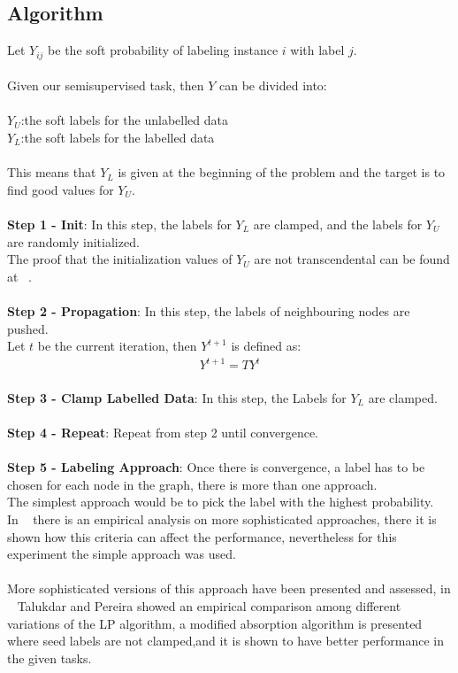 \documentclass[4pt,a4paper,twocolumn]{article}
\begin{document}
\subsection{Algorithm}
Let $Y_{ij}$ be the soft probability of labeling instance $i$ with label $j$.\\
\\
Given our semisupervised task, then $Y$ can be divided into:\\
\\
$Y_{U}$:the soft labels for the unlabelled data\\
$Y_{L}$:the soft labels for the labelled data\\
\\
This means that $Y_{L}$ is given at the beginning of the problem
and the target is to find good values for $Y_{U}$.\\
\\
\textbf{Step 1 - Init}: In this step, the labels for $Y_{L}$ are clamped, and the labels for $Y_{U}$ are randomly initialized.\\
The proof that the initialization values of $Y_{U}$ are not transcendental can be found at ~\cite{Zhu:2005:SLG:1104523}.\\
\\
\textbf{Step 2 - Propagation}: In this step, the labels of neighbouring nodes are pushed.\\
Let $t$ be the current iteration, then $Y^{t+1}$ is defined as:
\begin{align}
Y^{t+1} = T Y^{t}
\end{align}
\\
\textbf{Step 3 - Clamp Labelled Data}: In this step, the Labels for $Y_{L}$ are clamped.\\
\\
\textbf{Step 4 - Repeat}: Repeat from step 2 until convergence.\\
\\
\textbf{Step 5 - Labeling Approach}: Once there is convergence, a label has to be chosen for each node in the graph, there is more than one approach.\\
The simplest approach would be to pick the label with the highest probability. \\
In ~\cite{Zhu:2005:SLG:1104523} there is an empirical analysis on more sophisticated approaches, there it is shown how this criteria can affect the performance, nevertheless for this experiment the simple approach was used.\\
\\
More sophisticated versions of this approach have been presented and assessed, in ~\cite{Talukdar:2010:EGS:1858681.1858830} Talukdar and Pereira showed an empirical comparison among different variations of the LP algorithm, a modified absorption algorithm is presented where seed labels are not clamped,and it is shown to have better performance in the given tasks.
\end{document}
